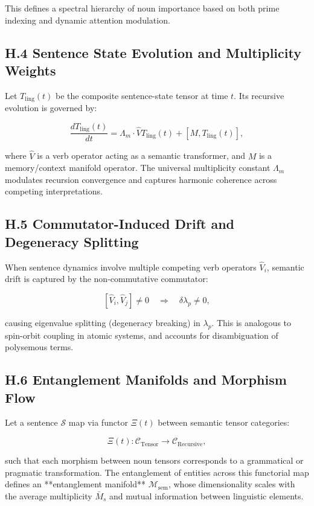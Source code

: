\documentclass[12pt]{article}
\begin{document}
\begin{itemize}
This defines a spectral hierarchy of noun importance based on both prime indexing and dynamic attention modulation.

\subsection*{H.4 Sentence State Evolution and Multiplicity Weights}

Let \( T_{\text{ling}}(t) \) be the composite sentence-state tensor at time \( t \). Its recursive evolution is governed by:

\[
\frac{d T_{\text{ling}}(t)}{dt} = \Lambda_m \cdot \hat{V} T_{\text{ling}}(t) + [M, T_{\text{ling}}(t)],
\]

where \( \hat{V} \) is a verb operator acting as a semantic transformer, and \( M \) is a memory/context manifold operator. The universal multiplicity constant \( \Lambda_m \) modulates recursion convergence and captures harmonic coherence across competing interpretations.

\subsection*{H.5 Commutator-Induced Drift and Degeneracy Splitting}

When sentence dynamics involve multiple competing verb operators \( \hat{V}_i \), semantic drift is captured by the non-commutative commutator:

\[
[\hat{V}_i, \hat{V}_j] \neq 0 \quad \Rightarrow \quad \delta \lambda_p \neq 0,
\]

causing eigenvalue splitting (degeneracy breaking) in \( \lambda_p \). This is analogous to spin-orbit coupling in atomic systems, and accounts for disambiguation of polysemous terms.

\subsection*{H.6 Entanglement Manifolds and Morphism Flow}

Let a sentence \( \mathcal{S} \) map via functor \( \Xi(t) \) between semantic tensor categories:

\[
\Xi(t): \mathcal{C}_{\text{Tensor}} \rightarrow \mathcal{C}_{\text{Recursive}},
\]

such that each morphism between noun tensors corresponds to a grammatical or pragmatic transformation. The entanglement of entities across this functorial map defines an **entanglement manifold** \( \mathcal{M}_{\text{sem}} \), whose dimensionality scales with the average multiplicity \( \bar{M}_s \) and mutual information between linguistic elements.


\end{itemize}
\end{document}
